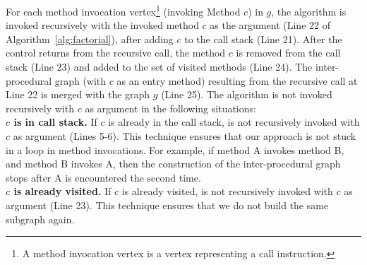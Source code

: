 For each method invocation vertex\footnote{\scriptsize{A method invocation vertex is a vertex representing a call instruction.}} (invoking Method $c$) in $g$, the algorithm  is invoked recursively with the invoked method $c$ as the argument (Line 22 of Algorithm~\ref{alg:factorial}), after adding $c$ to the call stack (Line 21). After the control returns from the recursive call, the method $c$ is removed from the call stack (Line 23) and added to the set of visited methods (Line 24). The inter-procedural graph  (with $c$ as an entry method) resulting from the recursive call at Line 22 is merged with the graph $g$ (Line 25).
The algorithm  is not invoked recursively with $c$ as argument in the following situations:
\\ \textbf{$c$ is in call stack.} If $c$ is already in the call stack,  is not recursively invoked with $c$ as argument (Lines 5-6). This technique ensures that our approach is not stuck in a loop in method invocations. For example, if method A invokes method B, and method B invokes A, then the construction of the inter-procedural graph stops after A is encountered the second time.
\\ \textbf{ $c$ is already visited.} If $c$ is already visited,  is not recursively invoked with $c$ as argument (Line 23). This technique ensures that we do not build the same subgraph again.
